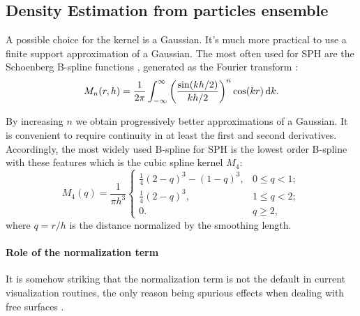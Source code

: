 

\subsection{Density Estimation from particles ensemble}
A possible choice for the kernel is a Gaussian.
It's much more practical to use a finite support approximation of a Gaussian.
The most often used for SPH are the Schoenberg  B-spline functions \citep{Schoenberg1946}, generated as the Fourier transform \citep{Monaghan1985, Monaghan2005, Price2012}:
\begin{equation}
M_n(r, h) = \frac{1}{2\pi}\int_{-\infty}^{\infty}{\left(\frac{\sin(kh/2)}{kh/2}\right)^n\cos(kr)\operatorname{d}\!{k}}.
\end{equation}

By increasing $n$ we obtain progressively better approximations of a Gaussian.
It is convenient to require continuity in at least the first and second derivatives.
Accordingly, the most widely used B-spline for SPH is the lowest order B-spline with these features which is the cubic spline kernel $M_4$:
\begin{equation}
M_4(q) = \frac{1}{\pi h^3} \left\{
\begin{array}{ll}
\frac{1}{4}(2-q)^3 - (1 - q)^{3}, & 0 \le q < 1; \\
\frac{1}{4}(2-q)^3, & 1 \le q < 2; \\
0. & q \ge 2,
\end{array}
\right.
\label{eq:cubicspline}
\end{equation}
where $q=r/h$ is the distance normalized by the smoothing length.

\paragraph{Role of the normalization term}
It is somehow striking that the normalization term is not the default in current visualization routines, the only reason being spurious effects when dealing with free surfaces \citep{Price2007}.

